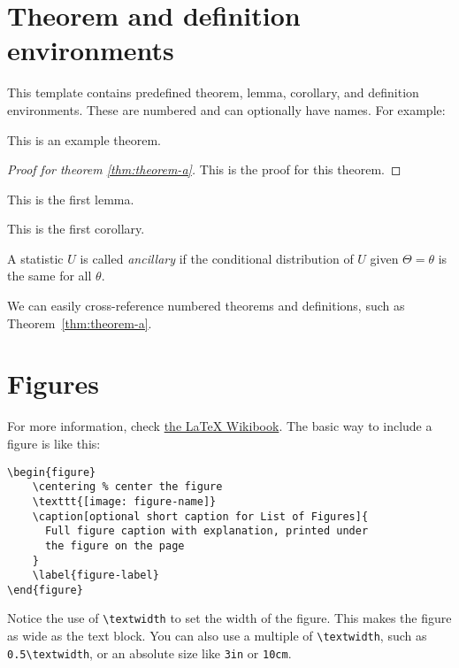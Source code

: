 \section{Theorem and definition environments}

This template contains predefined theorem, lemma, corollary, and definition
environments. These are numbered and can optionally have names. For example:
\begin{theorem}\label{thm:theorem-a}
  This is an example theorem.
\end{theorem}
\begin{proof}[Proof for theorem \ref{thm:theorem-a}]
  This is the proof for this theorem.
\end{proof}

\begin{lemma}
  This is the first lemma.
\end{lemma}
\begin{corollary}
  This is the first corollary.
\end{corollary}

\begin{definition}
  A statistic \(U\) is called \emph{ancillary} if the conditional distribution
  of \(U\) given \(\Theta = \theta\) is the same for all \(\theta\).
\end{definition}
We can easily cross-reference numbered theorems and definitions, such as
Theorem~\ref{thm:theorem-a}.

\section{Figures}

For more information, check
\href{https://en.wikibooks.org/wiki/LaTeX/Floats,_Figures_and_Captions}{the
  LaTeX Wikibook}. The basic way to include a figure is like this:

\begin{verbatim}
\begin{figure}
    \centering % center the figure
    \texttt{[image: figure-name]}
    \caption[optional short caption for List of Figures]{
      Full figure caption with explanation, printed under
      the figure on the page
    }
    \label{figure-label}
\end{figure}
\end{verbatim}

Notice the use of \verb|\textwidth| to set the width of the figure. This makes
the figure as wide as the text block. You can also use a multiple of
\verb|\textwidth|, such as \verb|0.5\textwidth|, or an absolute size like
\texttt{3in} or \texttt{10cm}.

